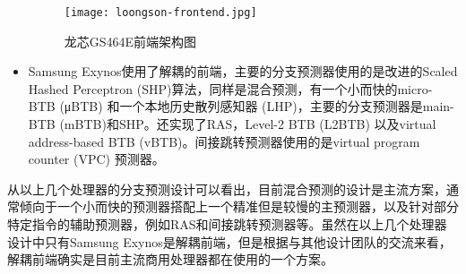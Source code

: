 \begin{itemize}[listparindent=2em]
    
    \begin{figure}[htb]
        \centering
        \setlength\tabcolsep{3pt}  %
        \vspace{5pt} %
        \texttt{[image: loongson-frontend.jpg]}
        \caption{龙芯GS464E前端架构图\cite{loongson}}
        \label{fig:figure12}
    \end{figure}
    
    \item Samsung Exynos\cite{samsung-exynos}使用了解耦的前端，主要的分支预测器使用的是改进的Scaled Hashed Perceptron (SHP)算法\cite{perceptrons,neural-branch,optimized-neural,strided-perceptron,merging-perceptron,revisited-perceptron}，同样是混合预测，有一个小而快的micro-BTB (μBTB) 和一个本地历史散列感知器 (LHP)，主要的分支预测器是main-BTB (mBTB)和SHP。还实现了RAS，Level-2 BTB (L2BTB) 以及virtual address-based BTB (vBTB)。间接跳转预测器使用的是virtual program counter (VPC)\cite{vpc} 预测器。
\end{itemize}

从以上几个处理器的分支预测设计可以看出，目前混合预测的设计是主流方案，通常倾向于一个小而快的预测器搭配上一个精准但是较慢的主预测器，以及针对部分特定指令的辅助预测器，例如RAS和间接跳转预测器等。虽然在以上几个处理器设计中只有Samsung Exynos是解耦前端，但是根据与其他设计团队的交流来看，解耦前端确实是目前主流商用处理器都在使用的一个方案。





